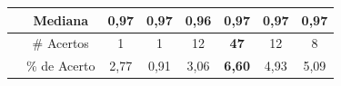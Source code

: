 \begin{quadro}[h]
\begin{tabular}{c|c|c|c|c|c|c|c|}
\multicolumn{1}{|c|}{}                                                                                   & Mediana      & \textbf{0,97}                                               & \textbf{0,97}                                             & 0,96                                                           & \textbf{0,97}                                                & \textbf{0,97} & \textbf{0,97} \\ \hline
\multicolumn{1}{l|}{}                                                                                    & \# Acertos   & 1                                                           & 1                                                         & 12                                                             & \textbf{47}                                                  & 12            & 8             \\ \cline{2-8} 
\multicolumn{1}{l|}{}                                                                                    & \% de Acerto & 2,77                                                        & 0,91                                                      & 3,06                                                           & \textbf{6,60}                                                & 4,93          & 5,09          \\ \cline{2-8} 
\end{tabular}
\end{quadro}


